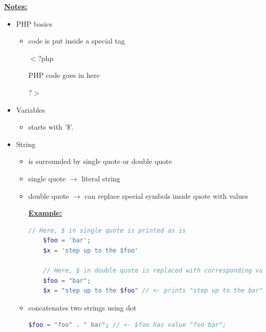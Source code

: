 \documentclass[12pt]{article}
\begin{document}
\begin{enumerate}[1.]
\begin{enumerate}[a)]
        \bigskip

        \underline{\textbf{Notes:}}

        \bigskip

        \begin{itemize}
            \item PHP basics
            \begin{itemize}
                \item code is put inside a special tag

                \bigskip

                $<?$php

                PHP code goes in here

                $?>$
            \end{itemize}

            \item Variables
            \begin{itemize}
                \item starts with '$\$$'.
            \end{itemize}

            \item String

            \begin{itemize}
                \item is surrounded by single quote or double quote
                \item single quote $\to$ literal string
                \item double quote $\to$ can replace special symbols inside quote with values

                \bigskip

                \underline{\textbf{Example:}}

    \begin{lstlisting}[language=PHP]
    // Here, $ in single quote is printed as is
    $foo = 'bar';
    $x = 'step up to the $foo'

    // Here, $ in double quote is replaced with corresponding value of variable
    $foo = "bar";
    $x = "step up to the $foo" // <- prints "step up to the bar"
    \end{lstlisting}

                \item concatenates two strings using dot

                \bigskip

    \begin{lstlisting}[language=PHP]
    $foo = "foo" . " bar"; // <- $foo has value "foo bar";
    \end{lstlisting}


\end{itemize}
\end{itemize}
\end{enumerate}
\end{enumerate}
\end{document}
